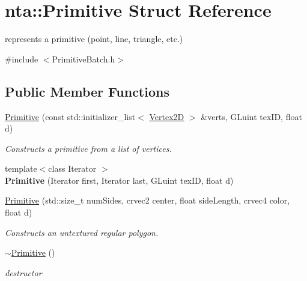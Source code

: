 \hypertarget{structnta_1_1Primitive}{}\section{nta\+:\+:Primitive Struct Reference}
\label{structnta_1_1Primitive}


represents a primitive (point, line, triangle, etc.)  




{\ttfamily \#include $<$Primitive\+Batch.\+h$>$}

\subsection*{Public Member Functions}
\begin{DoxyCompactItemize}
\item 
\mbox{\label{structnta_1_1Primitive_ad8eb45115ed7647d71360ce6366eb2bc}} 
\hyperlink{structnta_1_1Primitive_ad8eb45115ed7647d71360ce6366eb2bc}{Primitive} (const std\+::initializer\+\_\+list$<$ \hyperlink{structnta_1_1Vertex2D}{Vertex2D} $>$ \&verts, G\+Luint tex\+ID, float d)
\begin{DoxyCompactList}\small\item\em Constructs a primitive from a list of vertices. \end{DoxyCompactList}\item 
\mbox{\label{structnta_1_1Primitive_aa0325b0eb7dc6ec40294b9e47feb750b}} 
{\footnotesize template$<$class Iterator $>$ }\\{\bfseries Primitive} (Iterator first, Iterator last, G\+Luint tex\+ID, float d)
\item 
\mbox{\label{structnta_1_1Primitive_a6f5cc606b1b9e6537daa5f9413912416}} 
\hyperlink{structnta_1_1Primitive_a6f5cc606b1b9e6537daa5f9413912416}{Primitive} (std\+::size\+\_\+t num\+Sides, crvec2 center, float side\+Length, crvec4 color, float d)
\begin{DoxyCompactList}\small\item\em Constructs an untextured regular polygon. \end{DoxyCompactList}\item 
\mbox{\label{structnta_1_1Primitive_a39fbab541466b58744a8c7a0aa4eb49c}} 
\hyperlink{structnta_1_1Primitive_a39fbab541466b58744a8c7a0aa4eb49c}{$\sim$\+Primitive} ()
\begin{DoxyCompactList}\small\item\em destructor \end{DoxyCompactList}\end{DoxyCompactItemize}
